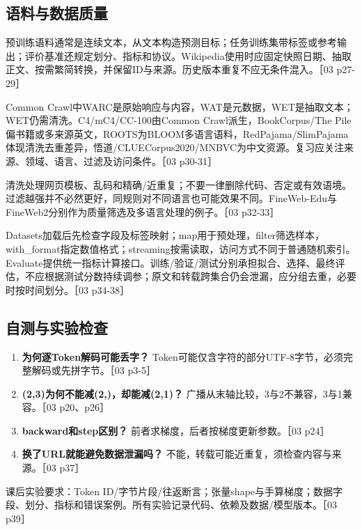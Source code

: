\documentclass[UTF8,a4paper,zihao=-4,fontset=windows]{ctexart}
\begin{document}
\subsection{语料与数据质量}
预训练语料通常是连续文本，从文本构造预测目标；任务训练集带标签或参考输出；评价基准还规定划分、指标和协议。Wikipedia使用时应固定快照日期、抽取正文、按需繁简转换，并保留ID与来源。历史版本重复不应无条件混入。［03 p27-29］

Common Crawl中WARC是原始响应与内容，WAT是元数据，WET是抽取文本；WET仍需清洗。C4/\allowbreak{}mC4/\allowbreak{}CC-100由Common Crawl派生，BookCorpus/\allowbreak{}The Pile偏书籍或多来源英文，ROOTS为BLOOM多语言语料，RedPajama/\allowbreak{}SlimPajama体现清洗去重差异，悟道/\allowbreak{}CLUECorpus2020/\allowbreak{}MNBVC为中文资源。复习应关注来源、领域、语言、过滤及访问条件。［03 p30-31］

清洗处理网页模板、乱码和精确/\allowbreak{}近重复；不要一律删除代码、否定或有效语境。过滤越强并不必然更好，同规则对不同语言也可能效果不同。FineWeb-Edu与FineWeb2分别作为质量筛选及多语言处理的例子。［03 p32-33］

Datasets加载后先检查字段及标签映射；map用于预处理，filter筛选样本，with\_format指定数值格式；streaming按需读取，访问方式不同于普通随机索引。Evaluate提供统一指标计算接口。训练/\allowbreak{}验证/\allowbreak{}测试分别承担拟合、选择、最终评估，不应根据测试分数持续调参；原文和转载跨集合仍会泄漏，应分组去重，必要时按时间划分。［03 p34-38］

\subsection{自测与实验检查}
\begin{enumerate}
\item {}\textbf{为何逐Token解码可能丢字？} Token可能仅含字符的部分UTF-8字节，必须完整解码或先拼字节。［03 p3-5］
\item {}\textbf{(2,3)为何不能减(2,)，却能减(2,1)？} 广播从末轴比较，3与2不兼容，3与1兼容。［03 p20、p26］
\item {}\textbf{backward和step区别？} 前者求梯度，后者按梯度更新参数。［03 p24］
\item {}\textbf{换了URL就能避免数据泄漏吗？} 不能，转载可能近重复，须检查内容与来源。［03 p37］
\end{enumerate}
课后实验要求：Token ID/\allowbreak{}字节片段/\allowbreak{}往返断言；张量shape与手算梯度；数据字段、划分、指标和错误案例。所有实验记录代码、依赖及数据/\allowbreak{}模型版本。［03 p39］
\end{document}
